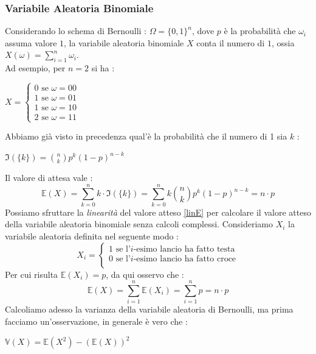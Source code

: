 \documentclass[12pt, letterpaper]{article}
\newcommand{\E}{{\mathbb E}}
\newcommand{\V}{{\mathbb V}}
\begin{document}
\subsubsection{Variabile Aleatoria Binomiale}
Considerando lo schema di Bernoulli : \(\Omega=\{0,1\}^n\), dove \(p\) è la probabilità che \(\omega_i\) assuma 
valore \(1\), la variabile aleatoria binomiale \(X\) conta 
il numero di \(1\), ossia \(X(\omega)=\displaystyle \sum_{i=1}^n\omega_i\). \\Ad esempio, per \(n=2\) si ha : 
\begin{center}
    \(
    X=\begin{cases}
        0\text{ se }\omega=00\\
        1\text{ se  }\omega=01\\
        1\text{  se }\omega=10\\
        2\text{ se  }\omega=11
    \end{cases}    
    \)
\end{center}
Abbiamo già visto in precedenza qual'è la probabilità che il numero di 1 sia \(k\) :\begin{center} 
    \(\Im(\{k\})=\displaystyle \binom{n}{k}p^k(1-p)^{n-k}\)\end{center}
    Il valore di attesa vale :
    \begin{equation}
        \mathbb{E}(X)=\sum_{k=0}^nk\cdot \Im(\{k\})=\sum_{k=0}^nk\binom{n}{k}p^k(1-p)^{n-k}=n\cdot p
    \end{equation}
Possiamo sfruttare la \textit{linearità} del valore atteso \ref{linE} per calcolare il valore atteso 
della variabile aleatoria binomiale senza calcoli complessi.
Consideriamo \(X_i\) la variabile aleatoria definita nel seguente modo : \begin{equation}
    X_i=\begin{cases}
        1 \text{ se l'}i\text{-esimo lancio ha fatto testa}\\
        0 \text{ se l'}i\text{-esimo lancio ha fatto croce}\\
    \end{cases}
\end{equation}
Per cui risulta \(\E(X_i)=p\), da qui osservo che :\begin{equation}
    \E(X)=\sum_{i=1}^n\E(X_i)=\sum_{i=1}^np=n\cdot p
\end{equation}
Calcoliamo adesso la varianza della variabile aleatoria di Bernoulli, ma prima facciamo un'osservazione, in generale
è vero che  :\begin{center}
    \(\V(X)=\E(X^2)-(\E(X))^2\)
\end{center}
\end{document}
